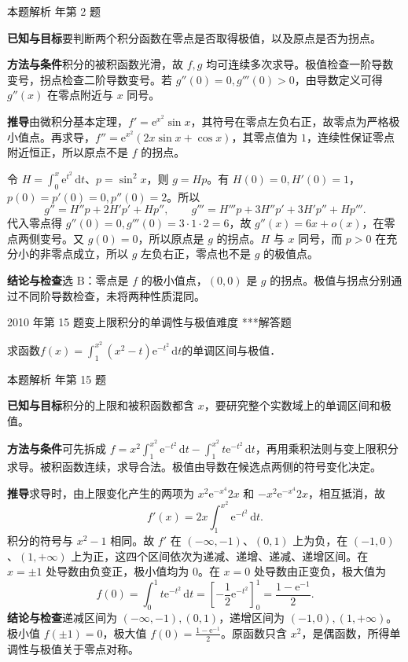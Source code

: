 \documentclass[UTF8,zihao=-4,fontset=fandol]{ctexart}
\newcounter{BankQuestion}
\newcommand{\QuestionPage}[7]{%
  \stepcounter{BankQuestion}%
  \par\noindent\begin{minipage}{\linewidth}
  \raggedright
  {\small\textcolor{black!60}{#3\quad #5\quad 难度 #7}\hfill\textcolor{accent}{#2}}\par\smallskip}
\newcommand{\QuestionEnd}{\end{minipage}\par\medskip}
\newcommand{\QuestionPage}[7]{%
  \clearpage
  \stepcounter{BankQuestion}%
  {\small\textcolor{accent}{#1\hfill #2}}\par\medskip
  {\small\textcolor{black!60}{#3\quad #5\quad 难度 #7\hfill \arabic{BankQuestion} / 234}}\par\vspace{9bp}}
\newcommand{\QuestionEnd}{}
\newenvironment{QuestionSolution}[1]{%
  \clearpage
  {\small\textcolor{black!60}{本题解析\quad #1}}\par\medskip
}{\par\clearpage}
\begin{document}
\begin{QuestionSolution}{2025 年第 2 题}
\textbf{已知与目标}\quad 要判断两个积分函数在零点是否取得极值，以及原点是否为拐点。

\textbf{方法与条件}\quad 积分的被积函数光滑，故 \(f,g\) 均可连续多次求导。极值检查一阶导数变号，拐点检查二阶导数变号。若 \(g''(0)=0,g'''(0)>0\)，由导数定义可得 \(g''(x)\) 在零点附近与 \(x\) 同号。

\textbf{推导}\quad 由微积分基本定理，\(f'=\mathrm e^{x^2}\sin x\)，其符号在零点左负右正，故零点为严格极小值点。再求导，\(f''=\mathrm e^{x^2}(2x\sin x+\cos x)\)，其零点值为 \(1\)，连续性保证零点附近恒正，所以原点不是 \(f\) 的拐点。

令 \(H=\int_0^x\mathrm e^{t^2}\,\mathrm dt\)、\(p=\sin^2x\)，则 \(g=Hp\)。有 \(H(0)=0,H'(0)=1\)，\(p(0)=p'(0)=0,p''(0)=2\)。所以
\[g''=H''p+2H'p'+Hp'',\qquad g'''=H'''p+3H''p'+3H'p''+Hp'''.\]
代入零点得 \(g''(0)=0,g'''(0)=3\cdot1\cdot2=6\)，故 \(g''(x)=6x+o(x)\)，在零点两侧变号。又 \(g(0)=0\)，所以原点是 \(g\) 的拐点。\(H\) 与 \(x\) 同号，而 \(p>0\) 在充分小的非零点成立，所以 \(g\) 左负右正，零点也不是 \(g\) 的极值点。

\textbf{结论与检查}\quad 选 \(\boxed{\mathrm B}\)：零点是 \(f\) 的极小值点，\((0,0)\) 是 \(g\) 的拐点。极值与拐点分别通过不同阶导数检查，未将两种性质混同。
\end{QuestionSolution}

\QuestionPage{2.6 函数性态的研究}{解答题}{2010 年第 15 题}{2}{变上限积分的单调性与极值}{119 / 234}{***}
求函数$f(x) = \int_1^{x^2} \left(x^2 - t \right) \mathrm{e}^{- t^2} \,\mathrm{d} t$的单调区间与极值．
\QuestionEnd

\begin{QuestionSolution}{2010 年第 15 题}
\textbf{已知与目标}\quad 积分的上限和被积函数都含 \(x\)，要研究整个实数域上的单调区间和极值。

\textbf{方法与条件}\quad 可先拆成 \(f=x^2\int_1^{x^2}\mathrm e^{-t^2}\,\mathrm dt-\int_1^{x^2}t\mathrm e^{-t^2}\,\mathrm dt\)，再用乘积法则与变上限积分求导。被积函数连续，求导合法。极值由导数在候选点两侧的符号变化决定。

\textbf{推导}\quad 求导时，由上限变化产生的两项为 \(x^2\mathrm e^{-x^4}2x\) 和 \(-x^2\mathrm e^{-x^4}2x\)，相互抵消，故
\[
f'(x)=2x\int_1^{x^2}\mathrm{e}^{-t^2}\,\mathrm{d}t.
\]
积分的符号与 \(x^2-1\) 相同。故 \(f'\) 在 \((-\infty,-1)\)、\((0,1)\) 上为负，在 \((-1,0)\)、\((1,+\infty)\) 上为正，这四个区间依次为递减、递增、递减、递增区间。在 \(x=\pm1\) 处导数由负变正，极小值均为 \(0\)。在 \(x=0\) 处导数由正变负，极大值为
\[
f(0)=\int_0^1 t\mathrm e^{-t^2}\,\mathrm dt
=\left[-\frac12\mathrm e^{-t^2}\right]_0^1=\frac{1-\mathrm e^{-1}}{2}.
\]
\textbf{结论与检查}\quad 递减区间为 \(\boxed{(-\infty,-1),(0,1)}\)，递增区间为 \(\boxed{(-1,0),(1,+\infty)}\)。极小值 \(\boxed{f(\pm1)=0}\)，极大值 \(\boxed{f(0)=\frac{1-\mathrm e^{-1}}2}\)。原函数只含 \(x^2\)，是偶函数，所得单调性与极值关于零点对称。
\end{QuestionSolution}
\end{document}
